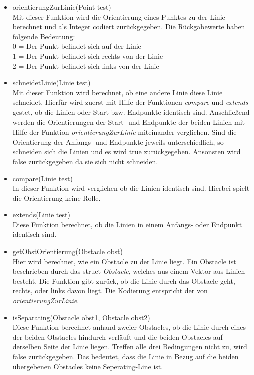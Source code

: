 \documentclass[a4paper]{scrartcl}
\begin{document}
\begin{itemize}
\item orientierungZurLinie(Point test)\\
Mit dieser Funktion wird die Orientierung eines Punktes zu der Linie berechnet und als Integer codiert zurückgegeben. Die Rückgabewerte haben folgende Bedeutung:\\
0 = Der Punkt befindet sich auf der Linie\\
1 = Der Punkt befindet sich rechts von der Linie\\
2 = Der Punkt befindet sich links von der Linie\\
\item schneidetLinie(Linie test)\\
Mit dieser Funktion wird berechnet, ob eine andere Linie diese Linie schneidet. Hierfür wird zuerst mit Hilfe der Funktionen \textit{compare} und \textit{extends} gestet, ob die Linien oder Start bzw. Endpunkte identisch sind. Anschließend werden die Orientierungen der Start- und Endpunkte der beiden Linien mit Hilfe der Funktion \textit{orientierungZurLinie} miteinander verglichen. Sind die Orientierung der Anfangs- und Endpunkte jeweils unterschiedlich, so schneiden sich die Linien und es wird true zurückgegeben. Ansonsten wird false zurückgegeben da sie sich nicht schneiden.
\item compare(Linie test)\\
In dieser Funktion wird verglichen ob die Linien identisch sind. Hierbei spielt die Orientierung keine Rolle.
\item extends(Linie test)\\
Diese Funktion berechnet, ob die Linien in einem Anfangs- oder Endpunkt identisch sind. 
\item getObstOrientierung(Obstacle obst)\\
Hier wird berechnet, wie ein Obstacle zu der Linie liegt. Ein Obstacle ist beschrieben durch das struct \textit{Obstacle}, welches aus einem Vektor aus Linien besteht. Die Funktion gibt zurück, ob die Linie durch das Obstacle geht, rechts, oder links davon liegt. Die Kodierung entspricht der von \textit{orientierungZurLinie}.
\item isSeparating(Obstacle obst1, Obstacle obst2)\\
Diese Funktion berechnet anhand zweier Obstacles, ob die Linie durch eines der beiden Obstacles hindurch verläuft und die beiden Obstacles auf derselben Seite der Linie liegen. Treffen alle drei Bedingungen nicht zu, wird false zurückgegeben. Das bedeutet, dass die Linie in Bezug auf die beiden übergebenen Obstacles keine Seperating-Line ist.

\end{itemize}
\end{document}
